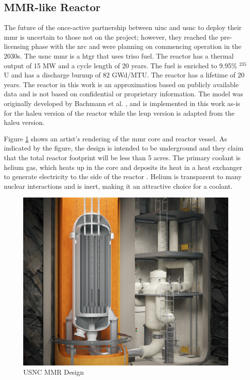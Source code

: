 \subsection{MMR-like Reactor}
\label{sec:mmr}

The future of the once-active partnership between \gls{uiuc} and \gls{usnc} to deploy their \gls{mmr} is uncertain to those not on the project; however, they reached the pre-licensing phase with the \gls{nrc} and were planning on commencing operation in the 2030s. The \gls{usnc} \gls{mmr} is a \gls{htgr} that uses \gls{triso} fuel. The reactor has a thermal output of 15 MW and a cycle length of 20 years. The fuel is enriched to 9.95\% $^{235}$U and has a discharge burnup of 82 GWd/MTU. The reactor has a lifetime of 20 years. The reactor in this work is an approximation based on publicly available data and is not based on confidential or proprietary information. The model was originally developed by Bachmann et al. \cite{bachmann_mmr_like_2023}, and is implemented in this work as-is for the \gls{haleu} version of the reactor while the \gls{leup} version is adapted from the \gls{haleu} version.

Figure \ref{fig:mmr_design} shows an artist's rendering of the \gls{mmr} core and reactor vessel. As indicated by the figure, the design is intended to be underground and they claim that the total reactor footprint will be less than 5 acres. The primary coolant is helium gas, which heats up in the core and deposits its heat in a heat exchanger to generate electricity to the side of the reactor \cite{usnc_chalk_river}. Helium is transparent to many nuclear interactions and is inert, making it an attractive choice for a coolant.

\begin{figure}[!htbp]
    \centering
    \includegraphics[scale=0.19]{images/reactor_design/wide-02.png}
    \caption{USNC MMR Design \cite{usnc_design_2021}}
    \label{fig:mmr_design}
\end{figure}

